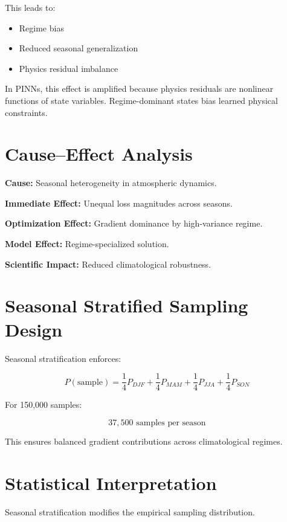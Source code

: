 \documentclass[12pt]{article}
\begin{document}
This leads to:

\begin{itemize}
    \item Regime bias
    \item Reduced seasonal generalization
    \item Physics residual imbalance
\end{itemize}

In PINNs, this effect is amplified because physics residuals are nonlinear functions of state variables. Regime-dominant states bias learned physical constraints.

\section{Cause–Effect Analysis}

\textbf{Cause:} Seasonal heterogeneity in atmospheric dynamics.

\textbf{Immediate Effect:} Unequal loss magnitudes across seasons.

\textbf{Optimization Effect:} Gradient dominance by high-variance regime.

\textbf{Model Effect:} Regime-specialized solution.

\textbf{Scientific Impact:} Reduced climatological robustness.

\section{Seasonal Stratified Sampling Design}

Seasonal stratification enforces:

\[
P(\text{sample}) = \frac{1}{4} P_{DJF} + \frac{1}{4} P_{MAM} + \frac{1}{4} P_{JJA} + \frac{1}{4} P_{SON}
\]

For 150,000 samples:

\[
37,500 \text{ samples per season}
\]

This ensures balanced gradient contributions across climatological regimes.

\section{Statistical Interpretation}

Seasonal stratification modifies the empirical sampling distribution.
\end{document}
